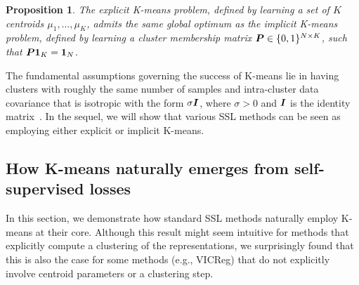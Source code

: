 \documentclass{article} %
\newtheorem{proposition}{Proposition}
\begin{document}
\begin{proposition}
    \label{prop:kmeans}
    The explicit K-means problem, defined by learning a set of $K$ centroids $\mu_1,\dots,\mu_{K}$, admits the same global optimum as the implicit K-means problem, defined by learning a cluster membership matrix ${\bm{P}} \in \{0,1\}^{N \times K}$, such that ${\bm{P}}\mathbf{1}_{K}=\mathbf{1}_{N}$.
\end{proposition}
The fundamental assumptions governing the success of K-means lie in having clusters with roughly the same number of samples and intra-cluster data covariance that is isotropic with the form $\sigma {\bm{I}}$, where $\sigma > 0$ and ${\bm{I}}$ is the identity matrix~\citep{wu2009adapting,liang2012k}.
In the sequel, we will show that various SSL methods can be seen as employing either explicit or implicit K-means.

\subsection{How K-means naturally emerges from self-supervised losses}
\label{sec:swav}

In this section, we demonstrate how standard SSL methods naturally employ K-means at their core.
Although this result might seem intuitive for methods that explicitly compute a clustering of the representations, we surprisingly found that this is also the case for some methods (e.g., VICReg) that do not explicitly involve centroid parameters or a clustering step.
\end{document}
